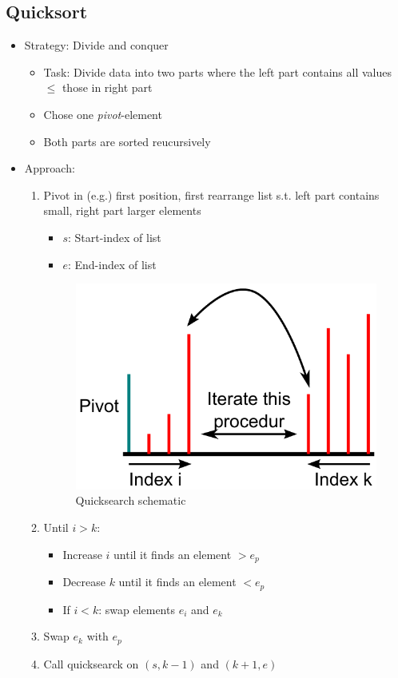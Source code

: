 \documentclass[12pt, a4paper]{scrartcl}
\begin{document}
\subsection{Quicksort}
\label{sec:quicksort}
\begin{itemize}
\item Strategy: Divide and conquer
  \begin{itemize}
  \item Task: Divide data into two parts where the left part contains all values $\le$ those in right part
  \item Chose one \emph{pivot}-element
  \item Both parts are sorted reucursively
  \end{itemize}
\item Approach:
  \begin{enumerate}
  \item Pivot in (e.g.) first position, first rearrange list s.t. left part contains small, right part larger elements
    \begin{itemize}
    \item $s$: Start-index of list
    \item $e$: End-index of list
    \end{itemize}
    \begin{figure}[htbp]
      \centering
      \includegraphics[width=.5\textwidth]{quicksort_schematic}
      \caption{Quicksearch schematic}
      \label{fig:quicksort_schematic}
    \end{figure}
  \item Until $i>k$:
    \begin{itemize}
    \item Increase $i$ until it finds an element $>e_p$
    \item Decrease $k$ until it finds an element $<e_p$
    \item If $i<k$: swap elements $e_i$ and $e_k$
    \end{itemize}
  \item Swap $e_k$ with $e_p$
  \item Call quicksearck on $(s,k-1)$ and $(k+1,e)$

\end{enumerate}
\end{itemize}
\end{document}
